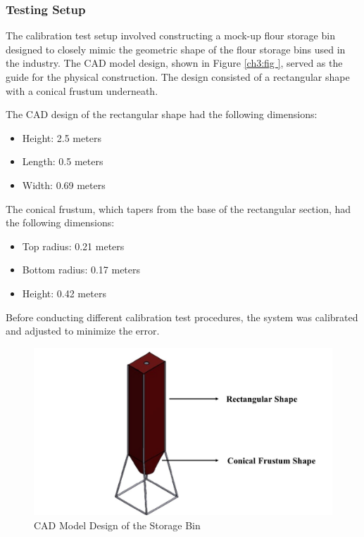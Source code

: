 \subsubsection{Testing Setup}
\label{ch3:subsubsec:testing-setup}

The calibration test setup involved constructing a mock-up flour storage bin designed to closely mimic the geometric shape of the flour storage bins used in the industry. The CAD model design, shown in Figure \ref{ch3:fig
}, served as the guide for the physical construction. The design consisted of a rectangular shape with a conical frustum underneath.

The CAD design of the rectangular shape had the following dimensions:
\begin{itemize}
	\item Height: 2.5 meters
	\item Length: 0.5 meters
	\item Width: 0.69 meters
\end{itemize}

The conical frustum, which tapers from the base of the rectangular section, had the following dimensions:
\begin{itemize}
	\item Top radius: 0.21 meters
	\item Bottom radius: 0.17 meters
	\item Height: 0.42 meters
\end{itemize}

Before conducting different calibration test procedures, the system was calibrated and adjusted to minimize the error.
\begin{figure}[H]
	\centering
	\includegraphics[width=1\textwidth]{Figures/cad_storage_bin}
	\caption{CAD Model Design of the Storage Bin}
	\label{ch3:fig
	}
\end{figure}


